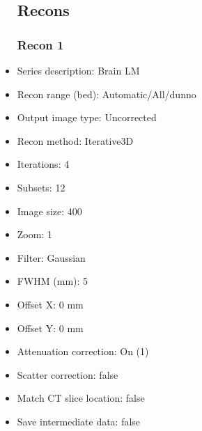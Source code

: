 \documentclass[12pt]{article}
\begin{document}
\begin{itemize}
\subsection{Recons}
\subsubsection{Recon 1}
\item Series description: Brain LM
\item Recon range (bed): Automatic/All/dunno
\item Output image type: Uncorrected
\item Recon method: Iterative3D
\item Iterations: 4
\item Subsets: 12
\item Image size: 400
\item Zoom: 1
\item Filter: Gaussian
\item FWHM (mm): 5
\item Offset X: 0 mm
\item Offset Y: 0 mm
\item Attenuation correction: On (1)
\item Scatter correction: false
\item Match CT slice location: false
\item Save intermediate data: false
\end{itemize}
\end{document}
